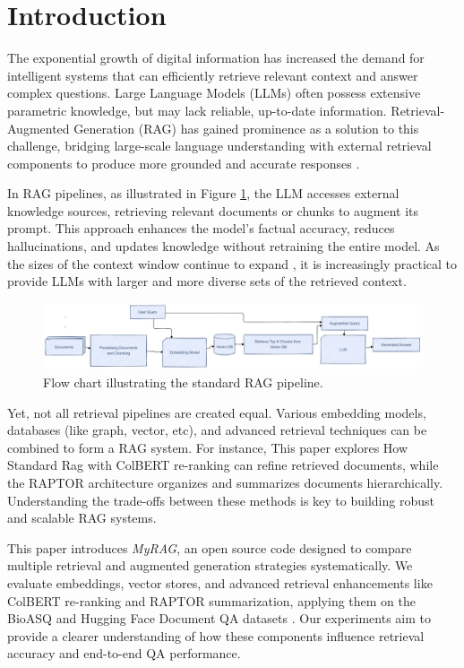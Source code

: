 \documentclass[pdflatex,sn-mathphys-num]{sn-jnl}%
\theoremstyle{thmstyleone}%
\theoremstyle{thmstyletwo}%
\theoremstyle{thmstylethree}%
\begin{document}
\section{Introduction}\label{sec1}

The exponential growth of digital information has increased the demand for intelligent systems that can efficiently retrieve relevant context and answer complex questions. Large Language Models (LLMs) often possess extensive parametric knowledge, but may lack reliable, up-to-date information. Retrieval-Augmented Generation (RAG) has gained prominence as a solution to this challenge, bridging large-scale language understanding with external retrieval components to produce more grounded and accurate responses \cite{lewis2020retrieval, guu2020realm}.

In RAG pipelines, as illustrated in Figure \ref{fig:standard_rag_flow},  the LLM accesses external knowledge sources, retrieving relevant documents or chunks to augment its prompt. This approach enhances the model’s factual accuracy, reduces hallucinations, and updates knowledge without retraining the entire model. As the sizes of the context window continue to expand \cite{liu2023lost}, it is increasingly practical to provide LLMs with larger and more diverse sets of the retrieved context.

\begin{figure}[h]
    \centering
    \includegraphics[width=\linewidth]{StandardRag.pdf} 
    \caption{Flow chart illustrating the standard RAG pipeline.}
    \label{fig:standard_rag_flow}
\end{figure}


Yet, not all retrieval pipelines are created equal. Various embedding models, databases (like graph, vector, etc), and advanced retrieval techniques can be combined to form a RAG system. For instance, This paper explores How Standard Rag with ColBERT \cite{khattab2020colbert} re-ranking can refine retrieved documents, while the RAPTOR architecture \cite{wu2021recursively, raptor2024} organizes and summarizes documents hierarchically. Understanding the trade-offs between these methods is key to building robust and scalable RAG systems.

This paper introduces \textit{MyRAG}, an open source code designed to compare multiple retrieval and augmented generation strategies systematically. We evaluate embeddings, vector stores, and advanced retrieval enhancements like ColBERT re-ranking and RAPTOR summarization, applying them on the BioASQ \cite{bioasq2023} and Hugging Face Document QA datasets \cite{huggingface2024docqa}. Our experiments aim to provide a clearer understanding of how these components influence retrieval accuracy and end-to-end QA performance.
 
\end{document}
